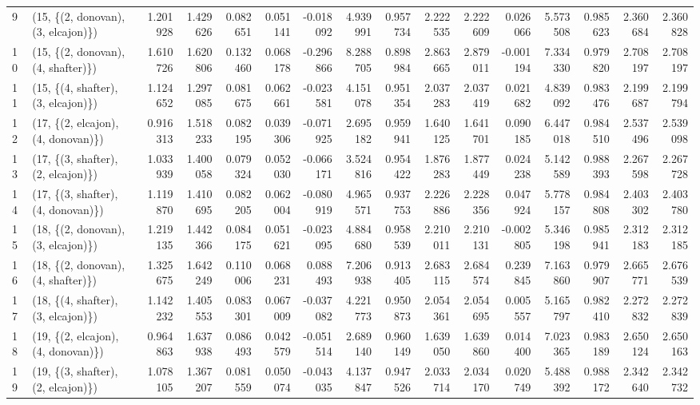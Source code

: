 \begin{tabular}{llrrrrrrrrrrrrrr}
9  &  (15, \{(2, donovan), (3, elcajon)\}) &  1.201928 &  1.429626 &   0.082651 &  0.051141 & -0.018092 &   4.939991 &  0.957734 &   2.222535 &  2.222609 &  0.026066 &  5.573508 &  0.985623 &  2.360684 &  2.360828 \\
10 &  (15, \{(2, donovan), (4, shafter)\}) &  1.610726 &  1.620806 &   0.132460 &  0.068178 & -0.296866 &   8.288705 &  0.898984 &   2.863665 &  2.879011 & -0.001194 &  7.334330 &  0.979820 &  2.708197 &  2.708197 \\
11 &  (15, \{(4, shafter), (3, elcajon)\}) &  1.124652 &  1.297085 &   0.081675 &  0.062661 & -0.023581 &   4.151078 &  0.951354 &   2.037283 &  2.037419 &  0.021682 &  4.839092 &  0.983476 &  2.199687 &  2.199794 \\
12 &  (17, \{(2, elcajon), (4, donovan)\}) &  0.916313 &  1.518233 &   0.082195 &  0.039306 & -0.071925 &   2.695182 &  0.959941 &   1.640125 &  1.641701 &  0.090185 &  6.447018 &  0.984510 &  2.537496 &  2.539098 \\
13 &  (17, \{(3, shafter), (2, elcajon)\}) &  1.033939 &  1.400058 &   0.079324 &  0.052030 & -0.066171 &   3.524816 &  0.954422 &   1.876283 &  1.877449 &  0.024238 &  5.142589 &  0.988393 &  2.267598 &  2.267728 \\
14 &  (17, \{(3, shafter), (4, donovan)\}) &  1.119870 &  1.410695 &   0.082205 &  0.062004 & -0.080919 &   4.965571 &  0.937753 &   2.226886 &  2.228356 &  0.047924 &  5.778157 &  0.984808 &  2.403302 &  2.403780 \\
15 &  (18, \{(2, donovan), (3, elcajon)\}) &  1.219135 &  1.442366 &   0.084175 &  0.051621 & -0.023095 &   4.884680 &  0.958539 &   2.210011 &  2.210131 & -0.002805 &  5.346198 &  0.985941 &  2.312183 &  2.312185 \\
16 &  (18, \{(2, donovan), (4, shafter)\}) &  1.325675 &  1.642249 &   0.110006 &  0.068231 &  0.088493 &   7.206938 &  0.913405 &   2.683115 &  2.684574 &  0.239845 &  7.163860 &  0.979907 &  2.665771 &  2.676539 \\
17 &  (18, \{(4, shafter), (3, elcajon)\}) &  1.142232 &  1.405553 &   0.083301 &  0.067009 & -0.037082 &   4.221773 &  0.950873 &   2.054361 &  2.054695 &  0.005557 &  5.165797 &  0.982410 &  2.272832 &  2.272839 \\
18 &  (19, \{(2, elcajon), (4, donovan)\}) &  0.964863 &  1.637938 &   0.086493 &  0.042579 & -0.051514 &   2.689140 &  0.960149 &   1.639050 &  1.639860 &  0.014400 &  7.023365 &  0.983189 &  2.650124 &  2.650163 \\
19 &  (19, \{(3, shafter), (2, elcajon)\}) &  1.078105 &  1.367207 &   0.081559 &  0.050074 & -0.043035 &   4.137847 &  0.947526 &   2.033714 &  2.034170 &  0.020749 &  5.488392 &  0.988172 &  2.342640 &  2.342732 \\

\end{tabular}

